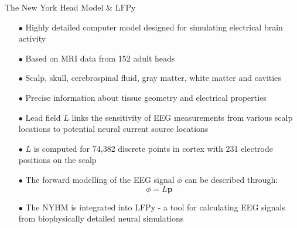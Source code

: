 \documentclass[aspectratio=169, 9pt]{beamer}
\begin{document}
\begin{frame}{The New York Head Model & LFPy}
    \begin{itemize}
        \item[$\bullet$] Highly detailed computer model designed for simulating electrical brain activity
        \item[$\bullet$] Based on MRI data from 152 adult heads
        \item[$\bullet$] Scalp, skull, cerebrospinal fluid, gray matter, white matter and cavities
        \item[$\bullet$] Precise information about tissue geometry and electrical properties
        \item[$\bullet$] Lead field $L$ links the sensitivity of EEG measurements from various scalp locations to potential neural current source locations
        \item[$\bullet$] $L$ is computed for 74,382 discrete points in cortex with 231 electrode positions on the scalp
        \item[$\bullet$] The forward modelling of the EEG signal $\phi$ can be described through:
          \begin{equation}
            \phi = L\textbf{p}
          \end{equation}
        \item[$\bullet$] The NYHM is integrated into LFPy - a tool for calculating EEG signals from biophysically detailed neural simulations
    \end{itemize}
\end{frame}
\end{document}
